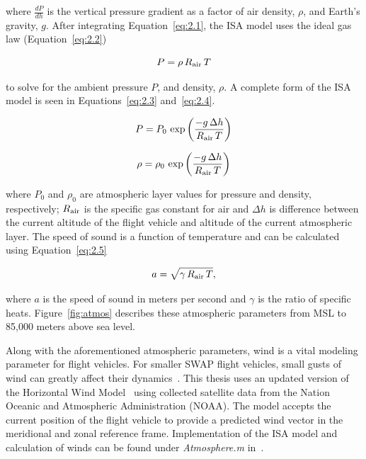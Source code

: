 \documentclass[12pt]{report}
\begin{document}
where \(\frac{dP}{dh}\) is the vertical pressure gradient as a factor of air density, \( \rho \), and Earth's gravity, \(g\). After integrating Equation~\ref{eq:2.1}, the ISA model uses the ideal gas law (Equation~\ref{eq:2.2})

\begin{equation}
  P = \rho \, R\textsubscript{air} \, T
  \label{eq:2.2}
\end{equation}

to solve for the ambient pressure \(P\), and density, \( \rho \). A complete form of the ISA model is seen in Equations~\ref{eq:2.3} and~\ref{eq:2.4}.

\begin{equation}
  P = P_0\,\exp\left({\frac{-g\,\Delta h}{R\textsubscript{air}\,T}}\right)
  \label{eq:2.3}
\end{equation}

\begin{equation}
  \rho = \rho_0\,\exp\left({\frac{-g\,\Delta h}{R\textsubscript{air}\,T}}\right)
  \label{eq:2.4}
\end{equation}

where \(P_0\) and \(\rho_0\) are atmospheric layer values for pressure and density, respectively; \(R\textsubscript{air}\) is the specific gas constant for air and \(\Delta h\) is difference between the current altitude of the flight vehicle and altitude of the current atmospheric layer. The speed of sound is a function of temperature and can be calculated using Equation~\ref{eq:2.5}

\begin{equation}
  a = \sqrt{\gamma \, R\textsubscript{air}\,T},
  \label{eq:2.5}
\end{equation}

where \(a\) is the speed of sound in meters per second and \( \gamma \) is the ratio of specific heats. Figure~\ref{fig:atmos} describes these atmospheric parameters from MSL to 85,000 meters above sea level.

Along with the aforementioned atmospheric parameters, wind is a vital modeling parameter for flight vehicles. For smaller SWAP flight vehicles, small gusts of wind can greatly affect their dynamics~\cite{raymerAircraftDesignConceptual2018}. This thesis uses an updated version of the Horizontal Wind Model~\cite{drobEmpiricalModelEarth2008,drobUpdateHorizontalWind2015} using collected satellite data from the Nation Oceanic and Atmospheric Administration (NOAA). The model accepts the current position of the flight vehicle to provide a predicted wind vector in the meridional and zonal reference frame. Implementation of the ISA model and calculation of winds can be found under \textit{Atmosphere.m} in~\cite{millerNsm0014thesis1969}.
\end{document}
